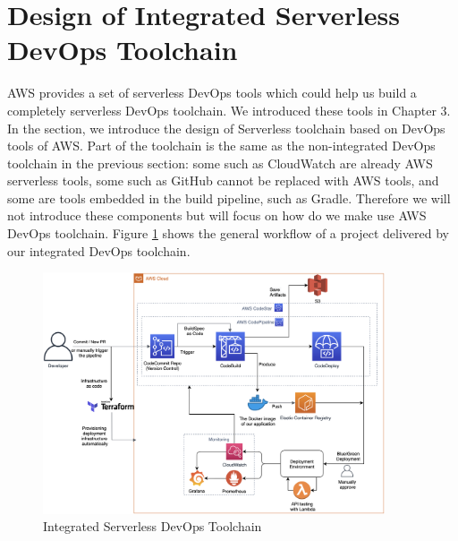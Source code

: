 \section{Design of Integrated Serverless DevOps Toolchain}
AWS provides a set of serverless DevOps tools which could help us build a completely serverless DevOps toolchain. We introduced these tools in Chapter 3. In the section, we introduce the design of Serverless toolchain based on DevOps tools of AWS. Part of the toolchain is the same as the non-integrated DevOps toolchain in the previous section: some such as CloudWatch are already AWS serverless tools, some such as GitHub cannot be replaced with AWS tools, and some are tools embedded in the build pipeline, such as Gradle. Therefore we will not introduce these components but will focus on how do we make use AWS DevOps toolchain. Figure \ref{fig:codepipeline} shows the general workflow of a project delivered by our integrated DevOps toolchain.
\begin{figure}[h]
 \centering
 \includegraphics[width=0.90\textwidth]{pics/codepipeline.png}
 \caption{Integrated Serverless DevOps Toolchain}
 \label{fig:codepipeline}
\end{figure}
